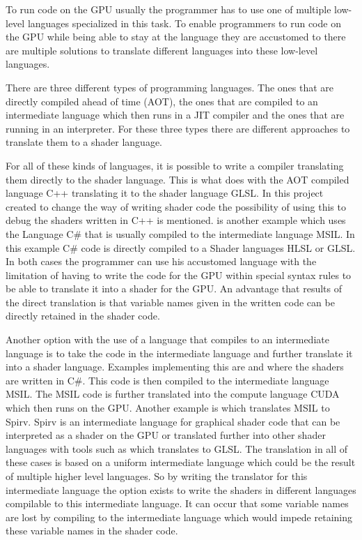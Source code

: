 To run code on the GPU usually the programmer has to use one of  multiple low-level languages specialized in this task. To enable programmers to run code on the GPU while being able to stay at the language they are accustomed to there are multiple solutions to translate different languages into these low-level languages.

There are three different types of programming languages. The ones that are directly compiled ahead of time (AOT), the ones that are compiled to an intermediate language which then runs in a JIT compiler and the ones that are running in an interpreter. For these three types there are different approaches to translate them to a shader language.

For all of these kinds of languages, it is possible to write a compiler translating them directly to the shader language. This is what  does with the AOT compiled language C++ translating it to the shader language GLSL. In this project created to change the way of writing shader code the possibility of using this to debug the shaders written in C++ is mentioned.  is another example which uses the Language C\# that is usually compiled to the intermediate language MSIL. In this example C\# code is directly compiled to a Shader languages HLSL or GLSL. In both cases the programmer can use his accustomed language with the limitation of having to write the code for the GPU within special syntax rules to be able to translate it into a shader for the GPU. An advantage that results of the direct translation is that variable names given in the written code can be directly retained in the shader code.

Another option with the use of a language that compiles to an intermediate language is to take the code in the intermediate language and further translate it into a shader language. Examples implementing this are  and  where the shaders are written in C\#. This code is then compiled to the intermediate language MSIL. The MSIL code is further translated into the compute language CUDA which then runs on the GPU. Another example is  which translates MSIL to Spirv. Spirv is an intermediate language for graphical shader code that can be interpreted as a shader on the GPU or translated further into other shader languages with tools such as  which translates to GLSL. The translation in all of these cases is based on a uniform intermediate language which could be the result of multiple higher level languages. So by writing the translator for this intermediate language the option exists to write the shaders in different languages compilable to this intermediate language. It can occur that some variable names are lost by compiling to the intermediate language which would impede retaining these variable names in the shader code. 

